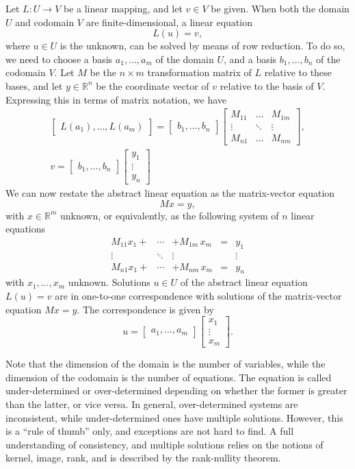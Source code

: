 \documentclass[12pt]{article}
\newcommand{\Rset}{\mathbb{R}}
\newcommand{\bmat}[1]{\begin{bmatrix}#1\end{bmatrix}}
\begin{document}
Let $L:U\rightarrow V$ be a linear mapping, and let $v\in V$ be given.
When both the domain $U$ and codomain $V$ are finite-dimensional, a
linear equation
$$L(u)=v,$$
where $u\in U$ is the unknown,
can be solved by means of row reduction.  To do so, we need
to choose a basis $a_1,\ldots, a_m$ of the domain $U$, and a basis
$b_1,\ldots, b_n$ of the codomain $V$.  Let $M$ be the $n\times m$
transformation matrix of $L$ relative to these bases, and let
$y\in\Rset^n$ be the coordinate vector of $v$ relative to the
basis of $V$.  Expressing this in terms of matrix notation, we have
\begin{gather*}
  \bmat{L(a_1),\ldots, L(a_m)} = 
\bmat{b_1,\ldots, b_n}
\bmat{ 
M_{11} & \ldots & M_{1m} \\
\vdots & \ddots & \vdots \\
M_{n1} & \ldots & M_{nm}},\\
v = \bmat{b_1,\ldots, b_n} \bmat{y_1\\ \vdots \\ y_n}
\end{gather*}
We can now restate the abstract linear equation as the matrix-vector
equation
\[ Mx =y,\]
with $x\in \Rset^m$ unknown, or equivalently, as  the following
system of $n$ linear equations
\[
  \begin{array}{ccccl}
  M_{11} x_1 + &\cdots &+ M_{1m}\, x_m &=& y_1 \\
  \vdots & \ddots & \vdots & &\vdots\\
  M_{n1} x_1  + &\cdots&  + M_{nm}\, x_m &=& y_n
  \end{array}
\]
with $x_1,\ldots, x_m$ unknown.  Solutions  $u\in U$ of the abstract linear
equation $L(u)=v$ are in one-to-one correspondence with solutions of
the matrix-vector equation $Mx=y$.  The correspondence is given by
\[ u = \bmat{a_1,\ldots, a_m} \bmat{x_1 \\ \vdots \\ x_m}.\]

Note that the dimension of the domain is the number of variables,
while the dimension of the codomain is the number of equations.  The
equation is called under-determined or over-determined depending on
whether the former is greater than the latter, or vice versa.  In
general, over-determined systems are inconsistent, while
under-determined ones have multiple solutions.  However, this is a
``rule of thumb'' only, and exceptions are not hard to find.  A full
understanding of consistency, and multiple solutions relies on the
notions of kernel, image, rank, and is described by the rank-nullity
theorem.
\end{document}
